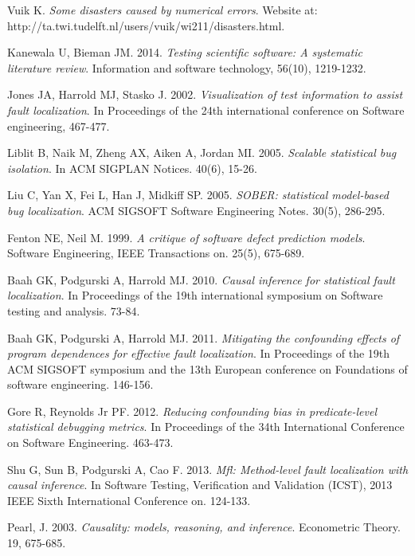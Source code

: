 \documentclass[times]{stvrauth}
\begin{document}
\begin{thebibliography}{9}

 Vuik K. {\it Some disasters caused by numerical errors}. Website at: http://ta.twi.tudelft.nl/users/vuik/wi211/disasters.html.

 Kanewala U, Bieman JM. 2014. {\it Testing scientific software: A systematic literature review}. Information and software technology, 56(10), 1219-1232.

 Jones JA, Harrold MJ, Stasko J. 2002. {\it Visualization of test information to assist fault localization}. In Proceedings of the 24th international conference on Software engineering, 467-477.

 Liblit B, Naik M, Zheng AX, Aiken A, Jordan MI. 2005. {\it Scalable statistical bug isolation}. In ACM SIGPLAN Notices. 40(6), 15-26.

 Liu C, Yan X, Fei L, Han J, Midkiff SP. 2005. {\it SOBER: statistical model-based bug localization}. ACM SIGSOFT Software Engineering Notes. 30(5), 286-295.

 Fenton NE, Neil M. 1999. {\it A critique of software defect prediction models}. Software Engineering, IEEE Transactions on. 25(5), 675-689.

 Baah GK, Podgurski A, Harrold MJ. 2010. {\it Causal inference for statistical fault localization}. In Proceedings of the 19th international symposium on Software testing and analysis. 73-84.

 Baah GK, Podgurski A, Harrold MJ. 2011. {\it Mitigating the confounding effects of program dependences for effective fault localization}. In Proceedings of the 19th ACM SIGSOFT symposium and the 13th European conference on Foundations of software engineering. 146-156.

 Gore R, Reynolds Jr PF. 2012. {\it Reducing confounding bias in predicate-level statistical debugging metrics}. In Proceedings of the 34th International Conference on Software Engineering. 463-473.

 Shu G, Sun B, Podgurski A, Cao F. 2013. {\it Mfl: Method-level fault localization with causal inference}. In Software Testing, Verification and Validation (ICST), 2013 IEEE Sixth International Conference on. 124-133.

 Pearl, J. 2003. {\it Causality: models, reasoning, and inference}. Econometric Theory. 19, 675-685.


\end{thebibliography}
\end{document}
